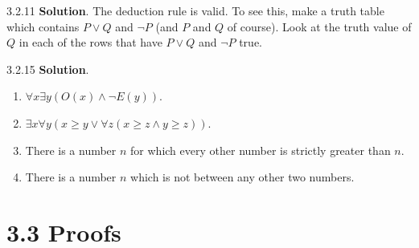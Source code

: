 \documentclass[11pt,]{book}
\theoremstyle{ptxplainnotitle}
\theoremstyle{ptxplaintitle}
\theoremstyle{ptxdefinitionnotitle}
\theoremstyle{ptxdefinitiontitle}
\theoremstyle{ptxdefinitionnotitle}
\theoremstyle{ptxdefinitiontitle}
\theoremstyle{ptxdefinitionnotitle}
\theoremstyle{ptxdefinitiontitle}
\theoremstyle{ptxdefinitiontitlenonumber}
\theoremstyle{ptxdefinitiontitlenonumber}
\numberwithin{equation}{chapter}
\begin{document}
\begin{divisionexercise}{3.2.11}
\textbf{Solution}.\quad%
\hypertarget{p-2344}{}%
The deduction rule is valid. To see this, make a truth table which contains \(P \vee Q\) and \(\neg P\) (and \(P\) and \(Q\) of course). Look at the truth value of \(Q\) in each of the rows that have \(P \vee Q\) and \(\neg P\) true.%
\end{divisionexercise}%
\begin{divisionexercise}{3.2.15}
\textbf{Solution}.\quad%
\hypertarget{p-2354}{}%
\leavevmode%
\begin{enumerate}[label=(\alph*)]
\item\hypertarget{li-1213}{}\(\forall x \exists y (O(x) \wedge \neg E(y))\).%
\item\hypertarget{li-1214}{}\(\exists x \forall y (x \ge y \vee \forall z (x \ge z \wedge y \ge z))\).%
\item\hypertarget{li-1215}{}\hypertarget{p-2355}{}%
There is a number \(n\) for which every other number is strictly greater than \(n\).%
\item\hypertarget{li-1216}{}\hypertarget{p-2356}{}%
There is a number \(n\) which is not between any other two numbers.%
\end{enumerate}
%
\end{divisionexercise}%
\section*{3.3 Proofs}
\end{document}
